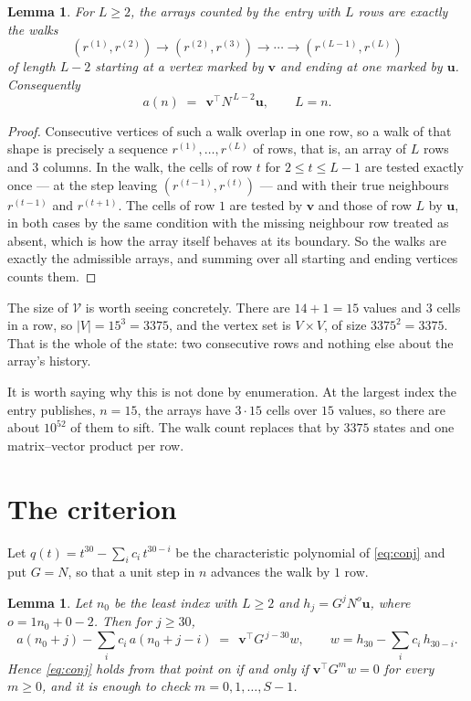 \documentclass[11pt,a4paper]{article}
\theoremstyle{plain}
\newtheorem{lemma}[theorem]{Lemma}
\theoremstyle{definition}
\begin{document}
\begin{lemma}\label{lem:walk}
For $L\ge2$, the arrays counted by the entry with $L$ rows are exactly the walks
\[
(r^{(1)},r^{(2)})\to(r^{(2)},r^{(3)})\to\cdots\to(r^{(L-1)},r^{(L)})
\]
of length $L-2$ starting at a vertex marked by $\mathbf{v}$ and ending at one marked by
$\mathbf{u}$. Consequently
\[
a(n)\;=\;\,\mathbf{v}^{\!\top}N^{\,L-2}\mathbf{u},\qquad L=n .
\]
\end{lemma}

\begin{proof}
Consecutive vertices of such a walk overlap in one row, so a walk of that shape is
precisely a sequence $r^{(1)},\dots,r^{(L)}$ of rows, that is, an array of $L$ rows
and $3$ columns. In the walk, the cells of row $t$ for $2\le t\le L-1$ are tested
exactly once --- at the step leaving $(r^{(t-1)},r^{(t)})$ --- and with their true
neighbours $r^{(t-1)}$ and $r^{(t+1)}$. The cells of row $1$ are tested by
$\mathbf{v}$ and those of row $L$ by $\mathbf{u}$, in both cases by the same condition
with the missing neighbour row treated as absent, which is how the array itself behaves at
its boundary. So the walks are exactly the admissible arrays, and summing over all starting
and ending vertices counts them.
\end{proof}


The size of $\mathcal V$ is worth seeing concretely. There are $14+1=15$ values
and $3$ cells in a row, so $|V|=15^{3}=3375$, and the vertex set is
$V\times V$, of size $3375^2=3375$. That is the whole of the state: two consecutive
rows and nothing else about the array's history.

It is worth saying why this is not done by enumeration. At the largest index the entry
publishes, $n=15$, the arrays have $3\cdot15$ cells over
$15$ values, so there are about $10^{52}$ of them to sift. The
walk count replaces that by $3375$ states and one matrix--vector product per row.
\section{The criterion}

Let $q(t)=t^{30}-\sum_i c_i\,t^{30-i}$ be the characteristic polynomial of
\eqref{eq:conj} and put $G=N$, so that a unit step in $n$ advances the walk by
$1$ row.

\begin{lemma}\label{lem:crit}
Let $n_0$ be the least index with $L\ge2$ and $h_j=G^{j}N^{o}\mathbf{u}$, where
$o=1n_0+0-2$. Then for $j\ge30$,
\[
a(n_0+j)-\sum_i c_i\,a(n_0+j-i)\;=\;\,\mathbf{v}^{\!\top}G^{\,j-30}w,
\qquad w=h_{30}-\sum_i c_i\,h_{30-i} .
\]
Hence \eqref{eq:conj} holds from that point on if and only if
$\mathbf{v}^{\!\top}G^{m}w=0$ for every $m\ge0$, and it is enough to check
$m=0,1,\dots,S-1$.
\end{lemma}
\end{document}

